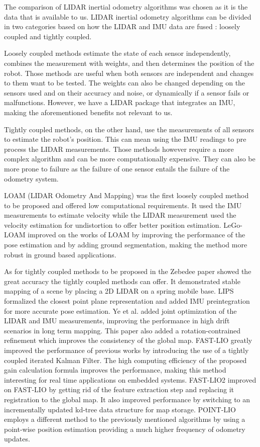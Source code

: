 \documentclass[12pt]{article}
\begin{document}
        The comparison of LIDAR inertial odometry algorithms was chosen as it is the data that is available to us. LIDAR inertial odometry algorithms can be divided in two categories based on how the LIDAR and IMU data are fused : loosely coupled and tightly coupled.

        Loosely coupled methods estimate the state of each sensor independently, combines the measurement with weights, and then determines the position of the robot. Those methods are useful when both sensors are independent and changes to them want to be tested. The weights can also be changed depending on the sensors used and on their accuracy and noise, or dynamically if a sensor fails or malfunctions. However, we have a LIDAR package that integrates an IMU, making the aforementioned benefits not relevant to us.

        Tightly coupled methods, on the other hand, use the measurements of all sensors to estimate the robot's position. This can mean using the IMU readings to pre process the LIDAR measurements. Those methods however require a more complex algorithm and can be more computationally expensive. They can also be more prone to failure as the failure of one sensor entails the failure of the odometry system.


        LOAM (LIDAR Odometry And Mapping) \cite{lee2024lidar} was the first loosely coupled method to be proposed and offered low computational requirements. It used the IMU measurements to estimate velocity while the LIDAR measurement used the velocity estimation for undistortion to offer better position estimation. LeGo-LOAM \cite{shan2018lego} improved on the works of LOAM by improving the performance of the pose estimation and by adding ground segmentation, making the method more robust in ground based applications.

        As for tightly coupled methods to be proposed in the Zebedee paper \cite{bosse2012zebedee} showed the great accuracy the tightly coupled methods can offer. It demonstrated stable mapping of a scene by placing a 2D LIDAR on a spring mobile base. LIPS \cite{geneva2018lips} formalized the closest point plane representation and added IMU preintegration for more accurate pose estimation. Ye et al. \cite{ye2019tightly} added joint optimization of the LIDAR and IMU measurements, improving the performance in high drift scenarios in long term mapping. This paper also added a rotation-contrained refinement which improves the consistency of the global map.
        FAST-LIO \cite{xu2021fast} greatly improved the performance of previous works by introducing the use of a tightly coupled iterated Kalman Filter. The high computing efficiency of the proposed gain calculation formula improves the performance, making this method interesting for real time applications on embedded systems. FAST-LIO2 \cite{xu2022fast} improved on FAST-LIO by getting rid of the feature extraction step and replacing it registration to the global map. It also improved performance by switching to an incrementally updated kd-tree data structure for map storage. 
        POINT-LIO \cite{he2023point} employs a different method to the previously mentioned algorithms by using a point-wise position estimation providing a much higher frequency of odometry updates.  
\end{document}
